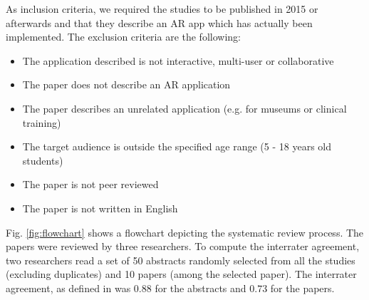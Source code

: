 As inclusion criteria, we required the studies to be published in 2015 or afterwards and that they describe an AR app which has actually been implemented. The exclusion criteria are the following:

\begin{itemize}
    \item The application described is not interactive, multi-user or collaborative
    \item The paper does not describe an AR application
    \item The paper describes an unrelated application (e.g. for museums or clinical training)
    \item The target audience is outside the specified age range (5 - 18 years old students)
    \item The paper is not peer reviewed
    \item The paper is not written in English
\end{itemize}

Fig. \ref{fig:flowchart} shows a flowchart depicting the systematic review process. The \papersToRead papers were reviewed by three researchers. To compute the interrater agreement, two researchers read a set of 50 abstracts randomly selected from all the studies (excluding duplicates) and 10 papers (among the \papersSelected selected paper). The interrater agreement, as defined in \citep{cohen1960coefficient} was $0.88$ for the abstracts and $0.73$ for the papers.



